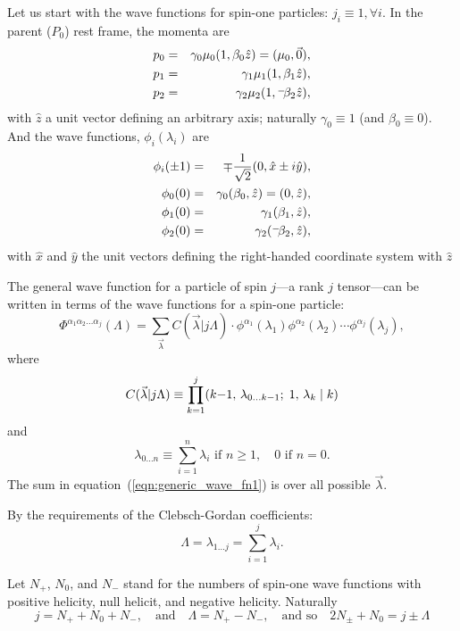 \documentclass[a4paper]{article}
\newcommand{\raisedminus}[3]{\raisebox{#1}{$#2{-}$}\hspace{#3}}
\newcommand{\unaryminus}{%
  \mathchoice{%
    \raisedminus{0.25em}{\scriptstyle}{-0.15em}%
  }{%
    \raisedminus{0.25em}{\scriptstyle}{-0.15em}%
  }{%
    \raisedminus{0.1em}{\scriptstyle}{-0.15em}%
  }{%
    \raisedminus{0.1em}{\scriptstyle}{-0.15em}%
  }%
}
\newcommand{\cg}[6]{\ensuremath{(#1,\,#2;\;#3,\,#4\;|\;#5\ifthenelse{\equal{#6}{}}{}{,\,#6})}}
\begin{document}
Let us start with the wave functions for spin-one particles: $j_i \equiv 1, \forall i$.
In the parent ($P_0$) rest frame, the momenta are
\begin{eqnarray*}
  p_0 & = & \gamma_0\mu_0(1, \beta_0\hat{z}) = (\mu_0,\vec{0}),\\
  p_1 & = & \gamma_1\mu_1(1, \beta_1\hat{z}),\\
  p_2 & = & \gamma_2\mu_2(1, \unaryminus\beta_2\hat{z}),\\
\end{eqnarray*}
with $\hat{z}$ a unit vector defining an arbitrary axis; naturally
$\gamma_0 \equiv 1$ (and $\beta_0 \equiv 0$). And the wave functions, $\phi_i(\lambda_i)$ are
\begin{eqnarray*}
  \phi_i(\pm1) & = & \mp\frac{1}{\sqrt{2}}(0, \hat{x} \pm i\hat{y}),\\
  \phi_0(0)    & = & \gamma_0(\beta_0,\hat{z}) = (0, \hat{z}),\\
  \phi_1(0)    & = & \gamma_1(\beta_1,\hat{z}),\\
  \phi_2(0)    & = & \gamma_2(\unaryminus\beta_2,\hat{z}),
\end{eqnarray*}
with $\hat{x}$ and $\hat{y}$ the unit vectors defining the
right-handed coordinate system with $\hat{z}$

The general wave function for a particle of spin $j$---a rank $j$
tensor---can be written in terms of the wave functions for a spin-one
particle:
\begin{equation}\label{eqn:generic_wave_fn1}
\Phi^{\alpha_1\alpha_2\dots\alpha_j}(\Lambda) =
\sum_{\vec\lambda} C(\vec\lambda|j\Lambda)\cdot
\phi^{\alpha_1}(\lambda_1)\phi^{\alpha_2}(\lambda_2)\cdots\phi^{\alpha_j}(\lambda_j),
\end{equation}
where
\begin{equation}\label{eqn:coupling}
C(\vec\lambda|j\Lambda) \equiv \prod_{k = 1}^{j}
\cg{k{-}1}{\lambda_{0\dots k{-}1}}{1}{\lambda_k}{k}{}
\end{equation}
and
\[
\lambda_{0\dots n} \equiv \sum_{i=1}^{n} \lambda_i \textrm{ if } n \ge 1,\quad 0 \textrm{ if } n = 0.
\]
The sum in equation~(\ref{eqn:generic_wave_fn1}) is over all possible $\vec\lambda$.

By the requirements of the Clebsch-Gordan coefficients:
\[
\Lambda = \lambda_{1\dots j} = \sum_{i=1}^{j} \lambda_i.
\]

Let $N_+$, $N_0$, and $N_-$ stand for the numbers of spin-one wave
functions with positive helicity, null helicit, and negative helicity.
Naturally
\[
j = N_+ + N_0 + N_-,
\quad \textrm{and} \quad
\Lambda = N_+ - N_-,
\quad \textrm{and so} \quad
2N_\pm +N_0 = j \pm \Lambda
\]
\end{document}

